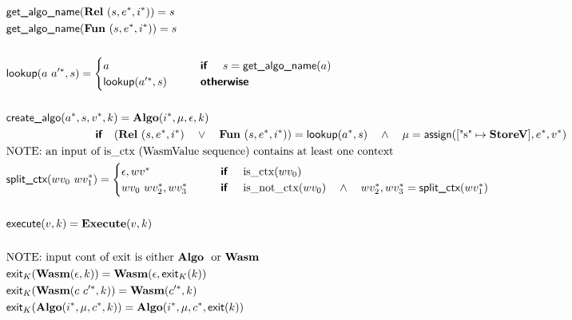 \begin{align*}
%
\newline \\
  &\getalgoname(\rel ~ (s, \seq e, \seq i)) = s \\
  &\getalgoname(\fun ~ (s, \seq e, \seq i)) = s \\
%
\newline \\
  &\lookup(a ~ \seq{a'}, s) =
    \begin{cases}
      a &\quad\quad \premise{if}\quad ~ s = \getalgoname(a) \\
      \lookup(\seq{a'}, s) &\quad\quad \premise{otherwise}
    \end{cases}
  \\
%
\newline \\
  &\createalgo(\seq a, s, \seq v, k) =
  \algo(\seq i, \mu, \epsilon, k) \\
  &\qquad\qquad\qquad\qquad\premise{if}\quad
  (\rel ~ (s, \seq e, \seq i) \quad\lor\quad \fun ~ (s, \seq e, \seq i)) = \lookup(\seq a, s)
  \quad\land\quad
  \mu = \assign([\text{"s"} \mapsto \storev], \seq e, \seq v)
%
\newline \\
&\text{NOTE: an input of is\_ctx (WasmValue sequence) contains at least one context} \\
  &\splitctx(wv_0 ~ \seq{wv_1}) =
    \begin{cases}
      \epsilon, \seq{wv} &\quad\quad \premise{if}\quad ~ \text{is\_ctx}(wv_0) \\
      wv_0 ~ \seq{wv_2}, \seq{wv_3} &\quad\quad \premise{if}\quad ~ \text{is\_not\_ctx}(wv_0) \quad\land\quad \seq{wv_2}, \seq{wv_3} = \splitctx(\seq{wv_1})
    \end{cases}
  \\
%
\newline \\
  &\execute(v, k) = \exe(v, k) \\
%
\newline \\
&\text{NOTE: input cont of exit is either \algo ~ or \wasm} \\
  &\exit_{K}(\wasm (\epsilon, k)) = \wasm(\epsilon, \exit_{K}(k)) \\
  &\exit_{K}(\wasm (c ~ \seq{c'}, k)) = \wasm(\seq{c'}, k) \\
  &\exit_{K}(\algo (\seq i, \mu, \seq c, k)) = \algo (\seq i, \mu, \seq c, \exit(k)) \\

\end{align*}
